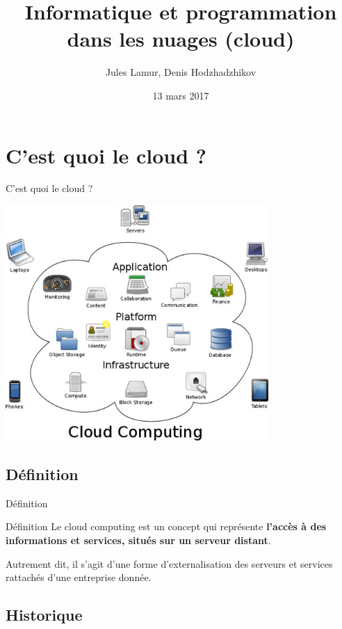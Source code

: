\documentclass{beamer}
\title{Informatique et programmation dans les nuages (cloud)}
\author{Jules Lamur, Denis Hodzhadzhikov}
\institute{Université de Montpellier 2}
\date{13 mars 2017}
\begin{document}
\begin{frame}
    \titlepage
\end{frame}

\begin{frame}
    \tableofcontents
\end{frame}

\section{C'est quoi le cloud ?}
\pause
\begin{frame}{C'est quoi le cloud ?}
    \centerline{\includegraphics[width=0.75\textwidth]{images/cloud_computing.jpg}}
\end{frame}

\subsection{Définition}

\begin{frame}{Définition}
    \begin{block}{Définition}
        Le cloud computing est un concept qui représente \textbf{l’accès à des informations et services, situés sur un serveur distant}.
    \end{block}
    \pause
    Autrement dit, il s’agit d’une forme d’externalisation des serveurs et services rattachés d’une entreprise donnée.
\end{frame}

\subsection{Historique}
\end{document}
